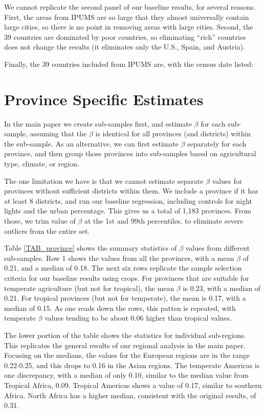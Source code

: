 \documentclass[11pt]{article}
\begin{document}
We cannot replicate the second panel of our baseline results, for several reasons. First, the areas from IPUMS are so large that they almost universally contain large cities, so there is no point in removing areas with large cities. Second, the 39 countries are dominated by poor countries, so eliminating ``rich'' countries does not change the results (it eliminates only the U.S., Spain, and Austria). 

Finally, the 39 countries included from IPUMS are, with the census date listed: 


\section{Province Specific Estimates}
In the main paper we create sub-samples first, and estimate $\beta$ for each sub-sample, assuming that the $\beta$ is identical for all provinces (and districts) within the sub-sample. As an alternative, we can first estimate $\beta$ separately for each province, and then group those provinces into sub-samples based on agricultural type, climate, or region. 

The one limitation we have is that we cannot estimate separate $\beta$ values for provinces without sufficient districts within them. We include a province if it has at least 8 districts, and run our baseline regression, including controls for night lights and the urban percentage. This gives us a total of 1,183 provinces. From those, we trim value of $\beta$ at the 1st and 99th percentiles, to eliminate severe outliers from the entire set. 

Table \ref{TAB_province} shows the summary statistics of $\beta$ values from different sub-samples. Row 1 shows the values from all the provinces, with a mean $\beta$ of 0.21, and a median of 0.18. The next six rows replicate the sample selection criteria for our baseline results using crops. For provinces that are suitable for temperate agriculture (but not for tropical), the mean $\beta$ is 0.23, with a median of 0.21. For tropical provinces (but not for temperate), the mean is 0.17, with a median of 0.15. As one reads down the rows, this patten is repeated, with temperate $\beta$ values tending to be about 0.06 higher than tropical values. 

The lower portion of the table shows the statistics for individual sub-regions. This replicates the general results of our regional analysis in the main paper. Focusing on the medians, the values for the European regions are in the range 0.22-0.25, and this drops to 0.16 in the Asian regions. The temperate Americas is one discrepancy, with a median of only 0.10, similar to the median value from Tropical Africa, 0.09. Tropical Americas shows a value of 0.17, similar to southern Africa. North Africa has a higher median, consistent with the original results, of 0.31. 
\end{document}
